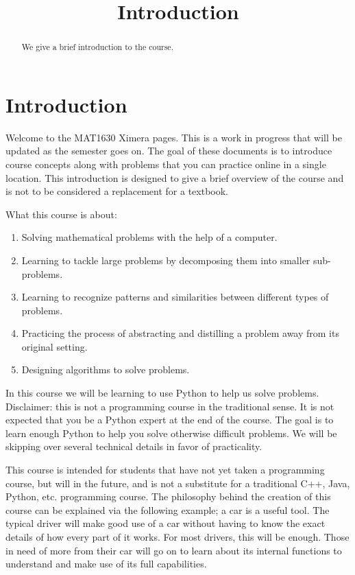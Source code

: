 \documentclass{ximera}
\title{Introduction}
\begin{document}
  
\begin{abstract}  
We give a brief introduction to the course.
\end{abstract}  
\maketitle

\section{Introduction}

Welcome to the MAT1630 Ximera pages. This is a work in progress that will be updated as the semester goes on. The goal of these documents is to introduce course concepts along with problems that you can practice online in a single location. 
This introduction is designed to give a brief overview of the course and is not to be considered a replacement for a textbook.

What this course is about:

\begin{enumerate}
	\item Solving mathematical problems with the help of a computer.
	\item Learning to tackle large problems by decomposing them into smaller sub-problems.
	\item Learning to recognize patterns and similarities between different types of problems.
	\item Practicing the process of abstracting and distilling a problem away from its original setting.
	\item Designing algorithms to solve problems.
\end{enumerate}

In this course we will be learning to use Python to help us solve problems. Disclaimer: this is not a programming course in the traditional sense. It is not expected that you be a Python expert at the end of the course. The goal is to learn enough Python to help you solve otherwise difficult problems. We will be skipping over several technical details in favor of practicality. 

This course is intended for students that have not yet taken a programming course, but will in the future, and is not a substitute for a traditional C++, Java, Python, etc. programming course. 
The philosophy behind the creation of this course can be explained via the following example; a car is a useful tool. The typical driver will make good use of a car without having to know the exact details of how every part of it works. For most drivers, this will be enough. Those in need of more from their car will go on to learn about its internal functions to understand and make use of its full capabilities. 
\end{document}

